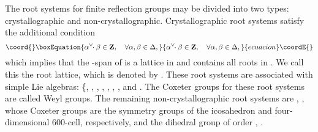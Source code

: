\documentclass[a4paper,12pt]{article}
\begin{document}
The root systems for finite reflection groups may be divided into two
types: crystallographic and non-crystallographic.
Crystallographic root systems satisfy the additional condition
\begin{equation}\coord{}\boxEquation{
   \alpha^{\vee}\!\!\cdot\beta\in\mathbf{Z},\quad \forall
   \alpha,\beta\in\Delta,
}{
   \alpha^{\vee}\!\!\cdot\beta\in\mathbf{Z},\quad \forall
   \alpha,\beta\in\Delta,
}{ecuacion}\coordE{}\end{equation}
which implies that the \coordHE{}-span of \myHighlight{\(\Pi\)}\coordHE{} is a lattice in
\coordHE{} and  contains all roots in \myHighlight{\(\Delta\)}\coordHE{}.
We call this the root lattice, which is denoted by \coordHE{}.
These root systems are associated with simple Lie
algebras: \{\coordHE{}, \coordHE{}, \coordHE{},
\coordHE{}, \coordHE{}, \coordHE{}, \coordHE{}, \coordHE{} and
\coordHE{}.  The Coxeter groups for these root
systems are called Weyl groups.  The remaining non-crystallographic root
systems %
are \coordHE{}, \coordHE{}, whose Coxeter groups are the
symmetry groups of the icosahedron and four-dimensional 600-cell,
respectively,
and the dihedral group of order \coordHE{}, \coordHE{}.
\end{document}
